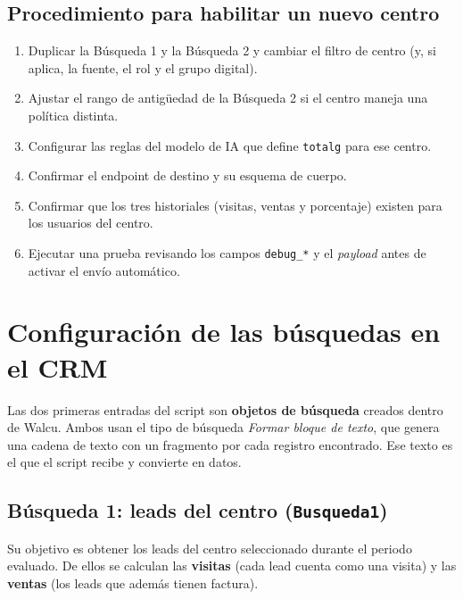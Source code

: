 \documentclass[11pt,a4paper]{article}
\newcommand{\code}[1]{\texttt{#1}}
\begin{document}
\subsection{Procedimiento para habilitar un nuevo centro}
\begin{enumerate}[nosep]
  \item Duplicar la Búsqueda 1 y la Búsqueda 2 y cambiar el filtro de centro (y, si aplica, la fuente, el rol y el grupo digital).
  \item Ajustar el rango de antigüedad de la Búsqueda 2 si el centro maneja una política distinta.
  \item Configurar las reglas del modelo de IA que define \code{totalg} para ese centro.
  \item Confirmar el endpoint de destino y su esquema de cuerpo.
  \item Confirmar que los tres historiales (visitas, ventas y porcentaje) existen para los usuarios del centro.
  \item Ejecutar una prueba revisando los campos \code{debug\_*} y el \emph{payload} antes de activar el envío automático.
\end{enumerate}

\section{Configuración de las búsquedas en el CRM}

Las dos primeras entradas del script son \textbf{objetos de búsqueda} creados dentro de Walcu. Ambos usan el tipo de búsqueda \emph{Formar bloque de texto}, que genera una cadena de texto con un fragmento por cada registro encontrado. Ese texto es el que el script recibe y convierte en datos.

\subsection{Búsqueda 1: leads del centro (\texttt{Busqueda1})}

Su objetivo es obtener los leads del centro seleccionado durante el periodo evaluado. De ellos se calculan las \textbf{visitas} (cada lead cuenta como una visita) y las \textbf{ventas} (los leads que además tienen factura).
\end{document}
